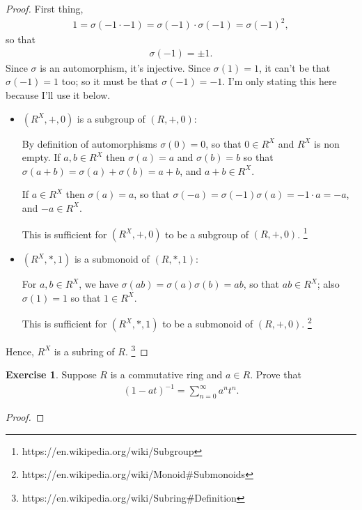 \documentclass[12pt]{extarticle}
\newcommand{\<}{\langle}
\renewcommand{\>}{\rangle}
\theoremstyle{definition}
\newtheorem{exercise}{Exercise}
\begin{document}
\begin{proof}
  First thing,
  \begin{align*}
    1 = \sigma(-1 \cdot -1) = \sigma(-1) \cdot \sigma(-1) = \sigma(-1)^2,
  \end{align*}
  so that
  \begin{align*}
    \sigma(-1) = \pm 1.
  \end{align*}
  Since $\sigma$ is an automorphism, it's injective. Since $\sigma(1) = 1$, it can't be that $\sigma(-1)=1$ too; so it must be that $\sigma(-1)=-1$. I'm only stating this here because I'll use it below. 
  
  \begin{itemize}
  \item
    $(R^X, +, 0)$ is a subgroup of $(R,+,0)$:

    By definition of automorphisms $\sigma(0)=0$, so that $0 \in R^X$ and $R^X$ is non empty. If $a,b \in R^X$ then $\sigma(a)=a$ and $\sigma(b)=b$ so that $\sigma(a+b) = \sigma(a) + \sigma(b) = a + b$, and $a+b \in R^X$.

    If $a \in R^X$ then $\sigma(a)=a$, so that $\sigma(-a) = \sigma(-1)\sigma(a) = -1 \cdot a = -a$, and $-a \in R^X$.

    This is sufficient for $(R^X,+,0)$ to be a subgroup of $(R,+,0)$. \footnote{https://en.wikipedia.org/wiki/Subgroup}
  \item
    $(R^X, *, 1)$ is a submonoid of $(R,*,1)$:

    For $a,b \in R^X$, we have $\sigma(ab) = \sigma(a)\sigma(b) = ab$, so that $ab \in R^X$; also $\sigma(1) = 1$ so that $1 \in R^X$.

    This is sufficient for $(R^X,*,1)$ to be a submonoid of $(R,+,0)$. \footnote{https://en.wikipedia.org/wiki/Monoid#Submonoids}
  \end{itemize}
  Hence, $R^X$ is a subring of $R$. \footnote{https://en.wikipedia.org/wiki/Subring#Definition}

\end{proof}
\begin{exercise}
  Suppose $R$ is a commutative ring and $a \in R$. Prove that
  \begin{align*}
    (1-at)^{-1} = \sum\limits_{n=0}^{\infty} a^n t^n.
  \end{align*}
\end{exercise}
\begin{proof}
  
\end{proof}
\end{document}
